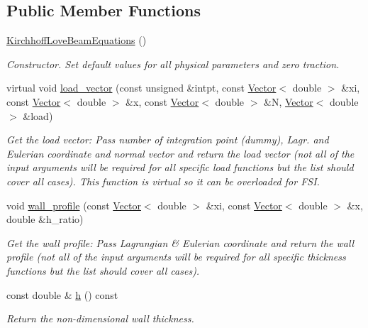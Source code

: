 \subsection*{Public Member Functions}
\begin{DoxyCompactItemize}
\item 
\hyperlink{classoomph_1_1KirchhoffLoveBeamEquations_a1593622c70aae5fdff3a8291e76871c6}{Kirchhoff\+Love\+Beam\+Equations} ()
\begin{DoxyCompactList}\small\item\em Constructor. Set default values for all physical parameters and zero traction. \end{DoxyCompactList}\item 
virtual void \hyperlink{classoomph_1_1KirchhoffLoveBeamEquations_aef8e5b3abb7669c7292103d7061f10c6}{load\+\_\+vector} (const unsigned \&intpt, const \hyperlink{classoomph_1_1Vector}{Vector}$<$ double $>$ \&xi, const \hyperlink{classoomph_1_1Vector}{Vector}$<$ double $>$ \&x, const \hyperlink{classoomph_1_1Vector}{Vector}$<$ double $>$ \&N, \hyperlink{classoomph_1_1Vector}{Vector}$<$ double $>$ \&load)
\begin{DoxyCompactList}\small\item\em Get the load vector\+: Pass number of integration point (dummy), Lagr. and Eulerian coordinate and normal vector and return the load vector (not all of the input arguments will be required for all specific load functions but the list should cover all cases). This function is virtual so it can be overloaded for F\+SI. \end{DoxyCompactList}\item 
void \hyperlink{classoomph_1_1KirchhoffLoveBeamEquations_a967cb9c4cf03007464eed6edcb7bccf6}{wall\+\_\+profile} (const \hyperlink{classoomph_1_1Vector}{Vector}$<$ double $>$ \&xi, const \hyperlink{classoomph_1_1Vector}{Vector}$<$ double $>$ \&x, double \&h\+\_\+ratio)
\begin{DoxyCompactList}\small\item\em Get the wall profile\+: Pass Lagrangian \& Eulerian coordinate and return the wall profile (not all of the input arguments will be required for all specific thickness functions but the list should cover all cases). \end{DoxyCompactList}\item 
const double \& \hyperlink{classoomph_1_1KirchhoffLoveBeamEquations_ad6fab6e7853b702cfe319b957b59c37f}{h} () const
\begin{DoxyCompactList}\small\item\em Return the non-\/dimensional wall thickness. \end{DoxyCompactList}\item 

\end{DoxyCompactItemize}
